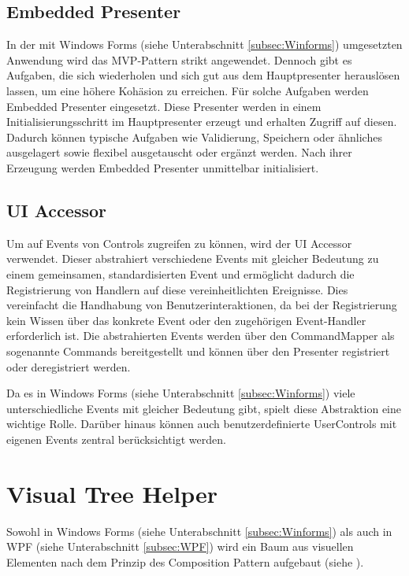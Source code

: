 \subsection{Embedded Presenter}
\label{subsec:embedded_presenter}
In der mit Windows Forms (siehe Unterabschnitt \ref{subsec:Winforms}) umgesetzten Anwendung wird das MVP-Pattern strikt angewendet. Dennoch gibt es Aufgaben, die sich wiederholen und sich gut aus dem Hauptpresenter herauslösen lassen, um eine höhere Kohäsion zu erreichen. Für solche Aufgaben werden Embedded Presenter eingesetzt. Diese Presenter werden in einem Initialisierungsschritt im Hauptpresenter erzeugt und erhalten Zugriff auf diesen. Dadurch können typische Aufgaben wie Validierung, Speichern oder ähnliches ausgelagert sowie flexibel ausgetauscht oder ergänzt werden. Nach ihrer Erzeugung werden Embedded Presenter unmittelbar initialisiert.

\subsection{UI Accessor}

Um auf Events von Controls zugreifen zu können, wird der UI Accessor verwendet. Dieser abstrahiert verschiedene Events mit gleicher Bedeutung zu einem gemeinsamen, standardisierten Event und ermöglicht dadurch die Registrierung von Handlern auf diese vereinheitlichten Ereignisse. Dies vereinfacht die Handhabung von Benutzerinteraktionen, da bei der Registrierung kein Wissen über das konkrete Event oder den zugehörigen Event-Handler erforderlich ist. Die abstrahierten Events werden über den CommandMapper als sogenannte Commands bereitgestellt und können über den Presenter registriert oder deregistriert werden.

Da es in Windows Forms (siehe Unterabschnitt \ref{subsec:Winforms}) viele unterschiedliche Events mit gleicher Bedeutung gibt, spielt diese Abstraktion eine wichtige Rolle. Darüber hinaus können auch benutzerdefinierte UserControls mit eigenen Events zentral berücksichtigt werden.

\section{Visual Tree Helper}
Sowohl in Windows Forms (siehe Unterabschnitt \ref{subsec:Winforms}) als auch in WPF (siehe Unterabschnitt \ref{subsec:WPF}) wird ein Baum aus visuellen Elementen nach dem Prinzip des Composition Pattern aufgebaut (siehe \cite{gamma1995design}).

